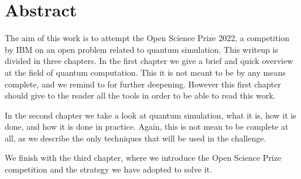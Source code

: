 \chapter{Abstract}
The aim of this work is to attempt the Open Science Prize 2022, a competition by IBM on an open problem related to quantum simulation.
This writeup is divided in three chapters. In the first chapter we give a brief and quick overview at the field of quantum computation. This it is not meant to be by any means complete, and we remind to \cite{NielsenChuang} for further deepening. However this first chapter should give to the reader all the tools in order to be able to read this work.

In the second chapter we take a look at quantum simulation, what it is, how it is done, and how it is done in practice. Again, this is not mean to be complete at all, as we describe the only techniques that will be used in the challenge.

We finish with the third chapter, where we introduce the Open Science Prize competition and the strategy we have adopted to solve it.